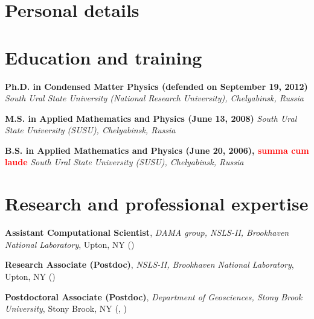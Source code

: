 \def\titlename{Bio}




\maketitle

\footnotesize

\vspace{-60pt}

\section{Personal details}



\section{Education and training}

{\textbf{Ph.D. in Condensed Matter Physics (defended on September 19, 2012)}
\newline \textit{South Ural State University (National Research University),
Chelyabinsk, Russia}}

{\textbf{M.S. in Applied Mathematics and Physics (June 13, 2008)} \newline
\textit{South Ural State University (SUSU), Chelyabinsk, Russia}}

{\textbf{B.S. in Applied Mathematics and Physics (June 20, 2006),
\textcolor{red}{summa cum laude}} \newline
\textit{South Ural State University (SUSU), Chelyabinsk, Russia}}


\section{Research and professional expertise}

 {\textbf{Assistant Computational Scientist}, \textit{DAMA group, NSLS-II,
Brookhaven National Laboratory}, Upton, NY ()}

 {\textbf{Research Associate (Postdoc)},
\textit{NSLS-II, Brookhaven National Laboratory}, Upton, NY
()}

{\textbf{Postdoctoral Associate (Postdoc)}, \textit{Department of Geosciences,
Stony Brook University}, Stony Brook, NY (,
)}


